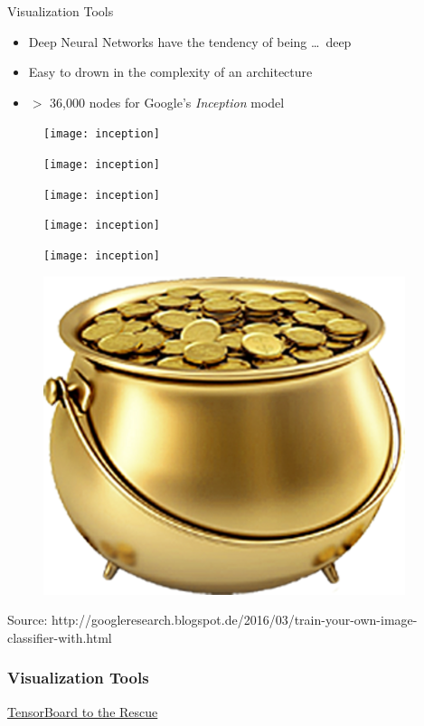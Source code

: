 \begin{slide}{Visualization Tools}
  \begin{itemize}
    \item Deep Neural Networks have the tendency of being \dots\, deep
    \item Easy to drown in the complexity of an architecture
    \item $>$ 36,000 nodes for Google's \emph{Inception} model
  \end{itemize}
  \begin{figure}
    \texttt{[image: inception]}
  \end{figure}
\end{slide}

\begin{frame}
  \begin{figure}
     \advance\leftskip-2.2cm
    \texttt{[image: inception]}
  \end{figure}
\end{frame}

\begin{frame}
  \begin{figure}
    \advance\leftskip-2.2cm
    \texttt{[image: inception]}
  \end{figure}
\end{frame}

\begin{frame}
  \begin{figure}
    \advance\leftskip-2.2cm
    \texttt{[image: inception]}
  \end{figure}
\end{frame}

\begin{frame}
  \begin{figure}
    \advance\leftskip-2.2cm
    \texttt{[image: inception]}

    \hspace{3cm}\includegraphics[scale=0.15]{gold}
    \vfill
  \end{figure}
  {\tiny Source: http://googleresearch.blogspot.de/2016/03/train-your-own-image-classifier-with.html}
\end{frame}

\begin{frame}
  \frametitle{Visualization Tools}
  \centering
  \Huge
  \color{orange}
  \href{https://www.tensorflow.org/tensorboard/index.html\#graphs}{TensorBoard to
    the Rescue}
\end{frame}


